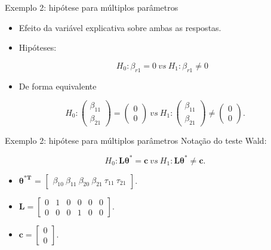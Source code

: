 \documentclass[
  ignorenonframetext,
  serif,
  professionalfont,
  usenames,
  dvipsnames,
  aspectratio = 169]{beamer}
\begin{document}
\begin{frame}{Exemplo 2: hipótese para múltiplos parâmetros}
\protect\hypertarget{exemplo-2-hipuxf3tese-para-muxfaltiplos-paruxe2metros}{}
\begin{itemize}
  \itemsep 2ex
  
  \item Efeito da variável explicativa sobre ambas as respostas.
  
  \item Hipóteses: 
  
$$H_0: \beta_{r1} = 0 \ vs \ H_1: \beta_{r1} \neq 0$$  

  \item De forma equivalente

\end{itemize}

\[
H_0: 
\begin{pmatrix}
\beta_{11} \\ 
\beta_{21}
\end{pmatrix} 
= 
\begin{pmatrix}
0 \\ 
0
\end{pmatrix}
\ vs \ 
H_1: 
\begin{pmatrix}
\beta_{11} \\ 
\beta_{21}
\end{pmatrix} 
\neq
\begin{pmatrix}
0 \\ 
0 
\end{pmatrix}.
\]
\end{frame}

\begin{frame}{Exemplo 2: hipótese para múltiplos parâmetros}
\protect\hypertarget{exemplo-2-hipuxf3tese-para-muxfaltiplos-paruxe2metros-1}{}
Notação do teste Wald:

\[H_0: \boldsymbol{L}\boldsymbol{\theta^{*}} = \boldsymbol{c} \ vs \ H_1: \boldsymbol{L}\boldsymbol{\theta^{*}} \neq \boldsymbol{c}.\]

\begin{itemize}
  
    \item $\boldsymbol{\theta^{*T}}$ = $\begin{bmatrix} \beta_{10} \  \beta_{11} \ \beta_{20} \ \beta_{21} \ \tau_{11} \ \tau_{21} \end{bmatrix}$.

    \item $\boldsymbol{L} = \begin{bmatrix} 0 & 1 & 0 & 0 & 0 & 0 \\
0 & 0 & 0 & 1 & 0 & 0 \end{bmatrix}.$
 
  \item $\boldsymbol{c} = \begin{bmatrix} 0 \\ 0 \end{bmatrix}.$

  \end{itemize}
\end{frame}
\end{document}
